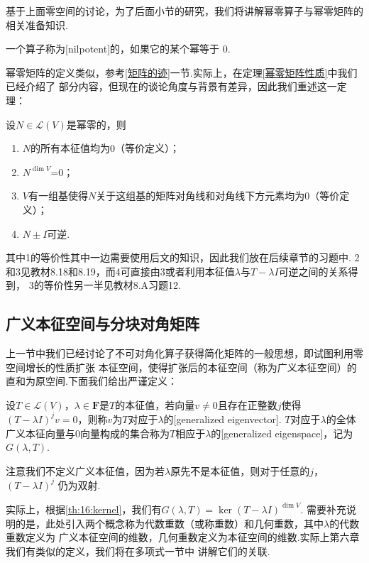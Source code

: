 基于上面零空间的讨论，为了后面小节的研究，我们将讲解幂零算子与幂零矩阵的相关准备知识.
\begin{definition}
    一个算子称为[nilpotent]的，如果它的某个幂等于 0.
\end{definition}
幂零矩阵的定义类似，参考\ref{矩阵的迹}一节.实际上，在定理\ref{幂零矩阵性质}中我们已经介绍了
部分内容，但现在的谈论角度与背景有差异，因此我们重述这一定理：
\begin{theorem} \label{nilpotent-operator}
    设$N\in \mathcal{L}(V)$是幂零的，则
    \begin{enumerate}
        \item $N$的所有本征值均为0（等价定义）；

        \item $N^{\dim V}$=0；

        \item $V$有一组基使得$N$关于这组基的矩阵对角线和对角线下方元素均为0（等价定义）；

        \item $N\pm I$可逆.
    \end{enumerate}
\end{theorem}
其中1的等价性其中一边需要使用后文的知识，因此我们放在后续章节的习题中.
2和3见教材8.18和8.19，而4可直接由3或者利用本征值$\lambda$与$T-\lambda I$可逆之间的关系得到，
3的等价性另一半见教材8.A习题12.

\subsection{广义本征空间与分块对角矩阵}
上一节中我们已经讨论了不可对角化算子获得简化矩阵的一般思想，即试图利用零空间增长的性质扩张
本征空间，使得扩张后的本征空间（称为广义本征空间）的直和为原空间.下面我们给出严谨定义：
\begin{definition}
    设$T\in \mathcal{L}(V)$，$\lambda\in\mathbf{F}$是$T$的本征值，若向量$v\neq 0$且存在正整数$j$使得
    $(T-\lambda I)^jv=0$，则称$v$为$T$对应于$\lambda$的[generalized eigenvector].
    $T$对应于$\lambda$的全体广义本征向量与0向量构成的集合称为$T$相应于$\lambda$的[generalized eigenspace]，记为$G(\lambda,T)$.
\end{definition}
注意我们不定义广义本征值，因为若$\lambda$原先不是本征值，则对于任意的$j$，$(T-\lambda I)^j$
仍为双射.

实际上，根据\autoref{th:16:kernel}，我们有$G(\lambda,T)=\ker (T-\lambda I)^{\dim V}$.
需要补充说明的是，此处引入两个概念称为代数重数（或称重数）和几何重数，其中$\lambda$的代数重数定义为
广义本征空间的维数，几何重数定义为本征空间的维数.实际上第六章我们有类似的定义，我们将在多项式一节中
讲解它们的关联.

